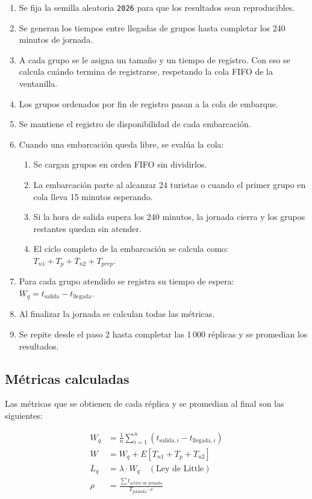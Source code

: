 \documentclass[12pt,a4paper]{article}
\begin{document}
\begin{enumerate}[noitemsep]
  \item Se fija la semilla aleatoria \texttt{2026} para que los
    resultados sean reproducibles.
  \item Se generan los tiempos entre llegadas de grupos hasta completar
    los 240 minutos de jornada.
  \item A cada grupo se le asigna un tamaño y un tiempo de registro.
    Con eso se calcula cuándo termina de registrarse, respetando la
    cola FIFO de la ventanilla.
  \item Los grupos ordenados por fin de registro pasan a la cola de
    embarque.
  \item Se mantiene el registro de disponibilidad de cada embarcación.
  \item Cuando una embarcación queda libre, se evalúa la cola:
    \begin{enumerate}[noitemsep,label=\alph*.]
      \item Se cargan grupos en orden FIFO sin dividirlos.
      \item La embarcación parte al alcanzar 24 turistas o cuando el
        primer grupo en cola lleva 15 minutos esperando.
      \item Si la hora de salida supera los 240 minutos, la jornada
        cierra y los grupos restantes quedan sin atender.
      \item El ciclo completo de la embarcación se calcula como:
        $T_{n1} + T_p + T_{n2} + T_{prep}$.
    \end{enumerate}
  \item Para cada grupo atendido se registra su tiempo de espera:
    $W_q = t_{\text{salida}} - t_{\text{llegada}}$.
  \item Al finalizar la jornada se calculan todas las métricas.
  \item Se repite desde el paso 2 hasta completar las 1\,000 réplicas
    y se promedian los resultados.
\end{enumerate}

\subsection{Métricas calculadas}

Las métricas que se obtienen de cada réplica y se promedian al final son
las siguientes:

\begin{align}
  W_q &= \frac{1}{n}\sum_{i=1}^{n}(t_{\text{salida},i} -
    t_{\text{llegada},i})
    \tag{Espera promedio} \\[6pt]
  W   &= W_q + E[T_{n1} + T_p + T_{n2}]
    \tag{Tiempo total en sistema} \\[6pt]
  L_q &= \lambda \cdot W_q \quad (\text{Ley de Little})
    \tag{Longitud de cola} \\[6pt]
  \rho &= \frac{\sum t_{\text{activo en jornada}}}{T_{\text{jornada}}
    \cdot c}
    \tag{Utilización de embarcaciones}
\end{align}
\end{document}
